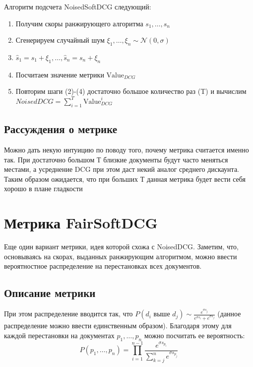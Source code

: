 \documentclass[14pt,a4paper]{amsart}
\theoremstyle{definition}
\theoremstyle{definition}
\newcommand{\N}{\mathcal{N}}
\newcommand{\Sum}{\sum\limits}
\renewcommand\t{\text}
\begin{document}
Алгоритм подсчета NoisedSoftDCG следующий:

\begin{enumerate}
\item Получим скоры ранжирующего алгоритма $s_1,\dots,s_n$
\item Сгенерируем случайный шум $\xi_1,\dots,\xi_n \sim \N(0,\sigma)$
\item $\hat{s}_1=s_1 + \xi_1,\dots,\hat{s}_n=s_n + \xi_n$
\item Посчитаем значение метрики $\t{Value}_{DCG}$
\item Повторим шаги (2)-(4) достаточно большое количество раз (T) и вычислим 
$NoisedDCG = \Sum_{i=1}^T \t{Value}_{DCG}^i$
\end{enumerate}

\subsection{Рассуждения о метрике}

Можно дать некую интуицию по поводу того, почему метрика считается именно так. При достаточно большом Т близкие документы будут часто меняться местами, а усреднение DCG при этом даст некий аналог среднего дискаунта. Таким образом ожидается, что при больших Т данная метрика будет вести себя хорошо в плане гладкости  



\newpage
\section{Метрика FairSoftDCG}

Еще один вариант метрики, идея которой схожа с NoisedDCG. Заметим, что, основываясь на скорах, выданных ранжирующим алгоритмом, можно ввести вероятностное распределение на перестановках всех документов. \\

\subsection{Описание метрики}

При этом распределение вводится так, что 
$P(d_i \t{ выше } d_j) \sim \frac{e^{\sigma s_j}}{e^{\sigma s_i} + e^{\sigma s_j}}$ (данное распределение можно ввести единственным образом). Благодаря этому для каждой перестановки на документах $p_1,\dots,p_n$ можно посчитать ее вероятность:
$$P(p_1,\dots,p_n) = \prod\limits_{i=1}^{n - 1} \frac{e^{\sigma s_{p_i}}}{\Sum_{k=j}^n e^{\sigma s_{p_j}}}$$
\end{document}
